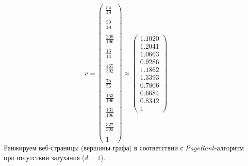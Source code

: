 \documentclass[a5paper, 10pt]{article}
\theoremstyle{definition}
\theoremstyle{plain}
\theoremstyle{remark}
\begin{document}
\begin{equation*}
v = 
\left(\begin{matrix}
\frac{54}{49} \\
\\
\frac{59}{49} \\
\\
\frac{209}{196} \\
\\
\frac{13}{14} \\
\\
\frac{465}{392} \\
\\
\frac{75}{56} \\
\\
\frac{153}{196} \\
\\
\frac{131}{196} \\
\\
\frac{327}{392} \\
\\
1
\end{matrix}\right)
\approx
\left(\begin{matrix}
1.1020 \\
1.2041 \\
1.0663 \\
0.9286 \\
1.1862 \\
1.3393 \\
0.7806 \\
0.6684 \\
0.8342 \\
1
\end{matrix}\right)
\end{equation*}
Ранжируем веб-страницы (вершины графа) в соответствии с \textit{PageRank}-алгоритм при отсутствии затухания ($d = 1$).
\end{document}
